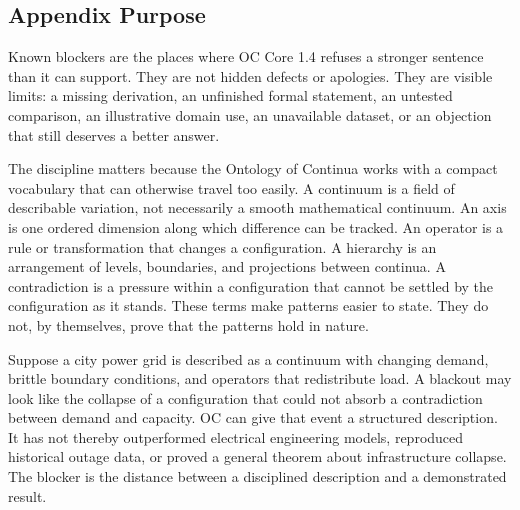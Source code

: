 \documentclass[11pt,a4paper,openany]{book}
\begin{document}
\subsection{Appendix Purpose}
Known blockers are the places where OC Core 1.4 refuses a stronger sentence than it can support. They are not hidden defects or apologies. They are visible limits: a missing derivation, an unfinished formal statement, an untested comparison, an illustrative domain use, an unavailable dataset, or an objection that still deserves a better answer. \cite{wilson_renormalization,landau_stat_physics}\par
The discipline matters because the Ontology of Continua works with a compact vocabulary that can otherwise travel too easily. A continuum is a field of describable variation, not necessarily a smooth mathematical continuum. An axis is one ordered dimension along which difference can be tracked. An operator is a rule or transformation that changes a configuration. A hierarchy is an arrangement of levels, boundaries, and projections between continua. A contradiction is a pressure within a configuration that cannot be settled by the configuration as it stands. These terms make patterns easier to state. They do not, by themselves, prove that the patterns hold in nature.\par
Suppose a city power grid is described as a continuum with changing demand, brittle boundary conditions, and operators that redistribute load. A blackout may look like the collapse of a configuration that could not absorb a contradiction between demand and capacity. OC can give that event a structured description. It has not thereby outperformed electrical engineering models, reproduced historical outage data, or proved a general theorem about infrastructure collapse. The blocker is the distance between a disciplined description and a demonstrated result.\par
\end{document}
